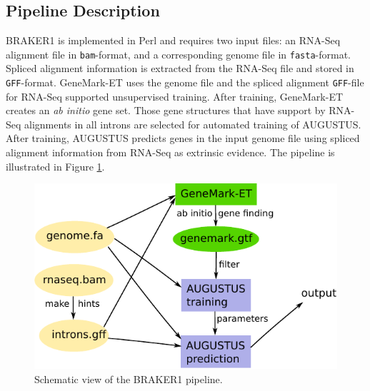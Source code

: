 \documentclass{bioinfo}
\begin{document}
\begin{methods}
\section{Pipeline Description}

BRAKER1 is implemented in Perl and requires two input files: an RNA-Seq alignment file in \texttt{bam}-format, and a corresponding genome file in \texttt{fasta}-format. Spliced alignment information is extracted from the RNA-Seq file and stored in \texttt{GFF}-format. GeneMark-ET uses the genome file and  the spliced alignment \texttt{GFF}-file for RNA-Seq supported unsupervised training. After training, GeneMark-ET creates an \textit{ab initio} gene set. Those gene structures that have support by RNA-Seq alignments in all introns are selected for automated training of AUGUSTUS. After training, AUGUSTUS predicts genes in the input genome file using spliced alignment information from RNA-Seq as extrinsic evidence. The pipeline is illustrated in Figure \ref{pipeline}.

\begin{figure}[!tpb]%
\centerline{\includegraphics[width=0.9\linewidth]{figs/Figure1.pdf}}
\caption{Schematic view of the BRAKER1 pipeline.}\label{pipeline}
\end{figure}


\end{methods}
\end{document}
